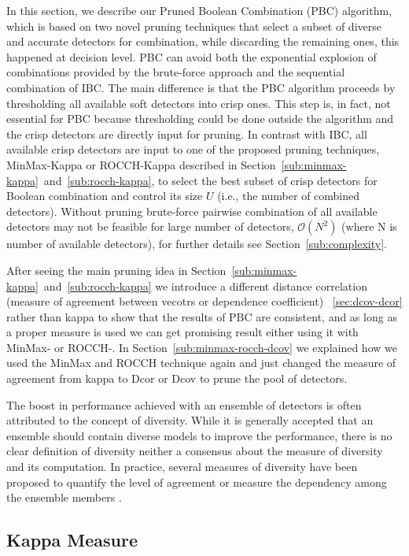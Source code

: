 In this section, we describe our Pruned Boolean Combination (PBC) algorithm, which is based on two novel pruning techniques that select a subset of diverse and accurate detectors for combination, while discarding the remaining ones, this happened at decision level.
PBC can avoid both the exponential explosion of combinations provided by the brute-force approach and the sequential combination of IBC.
The main difference is that the PBC algorithm proceeds by thresholding all available soft detectors into crisp ones.
This step is, in fact, not essential for PBC because thresholding could be done outside the algorithm and the crisp detectors are directly input for pruning.
In contrast with IBC, all available crisp detectors are input to one of the proposed pruning techniques, MinMax-Kappa or ROCCH-Kappa described in Section~\ref{sub:minmax-kappa}~and~\ref{sub:rocch-kappa}, to select the best subset of crisp detectors for Boolean combination and control its size $U$ (i.e., the number of combined detectors).
Without pruning brute-force pairwise combination of all available detectors may not be feasible for large number of detectors, $\mathcal{O}({N^2})$ (where N is number of available detectors), for further details see Section~\ref{sub:complexity}.
 
After seeing the main pruning idea in Section~\ref{sub:minmax-kappa}~and~\ref{sub:rocch-kappa} we introduce a different distance correlation (measure of agreement between vecotrs or dependence coefficient) ~\ref{sec:dcov-dcor} rather than kappa to show that the results of PBC are consistent, and as long as a proper measure is used we can get promising result either using it with MinMax- or ROCCH-. In Section~\ref{sub:minmax-rocch-dcov} we explained how we used the MinMax and ROCCH technique again and just changed the measure of agreement from kappa to Dcor or Dcov to prune the pool of detectors.

The boost in performance achieved with an ensemble of detectors is often attributed to the concept of diversity.
While it is generally accepted that an ensemble should contain diverse models to improve the performance, there is no clear definition of diversity neither a consensus about the measure of diversity and its computation.
In practice, several measures of diversity have been proposed to quantify the level of agreement or measure the dependency among the ensemble members \cite{Kuncheva2003b}.


\subsection{Kappa Measure}
\label{sec:kappa}

